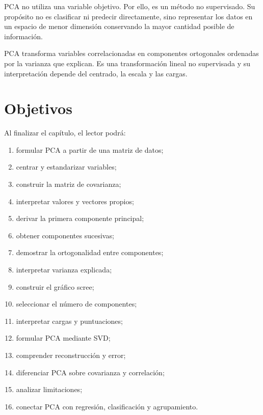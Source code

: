 \documentclass[
  spanish,
  10.5pt,
  letterpaper,
  DIV=11,
  numbers=noendperiod,
  oneside,
  open=any]{scrreprt}
\providecommand{\tightlist}{%
  \setlength{\itemsep}{0pt}\setlength{\parskip}{0pt}}
\theoremstyle{definition}
\theoremstyle{definition}
\theoremstyle{plain}
\theoremstyle{remark}
\begin{document}
PCA no utiliza una variable objetivo. Por ello, es un método no
supervisado. Su propósito no es clasificar ni predecir directamente,
sino representar los datos en un espacio de menor dimensión conservando
la mayor cantidad posible de información.

\begin{tcolorbox}[enhanced jigsaw, arc=.35mm, bottomrule=.15mm, bottomtitle=1mm, breakable, colback=white, colbacktitle=quarto-callout-important-color!10!white, colframe=quarto-callout-important-color-frame, coltitle=black, left=2mm, leftrule=.75mm, opacityback=0, opacitybacktitle=0.6, rightrule=.15mm, title=\textcolor{quarto-callout-important-color}{\faExclamation}\hspace{0.5em}{Definición esencial}, titlerule=0mm, toprule=.15mm, toptitle=1mm]

PCA transforma variables correlacionadas en componentes ortogonales
ordenadas por la varianza que explican. Es una transformación lineal no
supervisada y su interpretación depende del centrado, la escala y las
cargas.

\end{tcolorbox}

\section*{Objetivos}\label{objetivos-16}


Al finalizar el capítulo, el lector podrá:

\begin{enumerate}
\def\labelenumi{\arabic{enumi}.}
\tightlist
\item
  formular PCA a partir de una matriz de datos;
\item
  centrar y estandarizar variables;
\item
  construir la matriz de covarianza;
\item
  interpretar valores y vectores propios;
\item
  derivar la primera componente principal;
\item
  obtener componentes sucesivas;
\item
  demostrar la ortogonalidad entre componentes;
\item
  interpretar varianza explicada;
\item
  construir el gráfico scree;
\item
  seleccionar el número de componentes;
\item
  interpretar cargas y puntuaciones;
\item
  formular PCA mediante SVD;
\item
  comprender reconstrucción y error;
\item
  diferenciar PCA sobre covarianza y correlación;
\item
  analizar limitaciones;
\item
  conectar PCA con regresión, clasificación y agrupamiento.
\end{enumerate}
\end{document}

